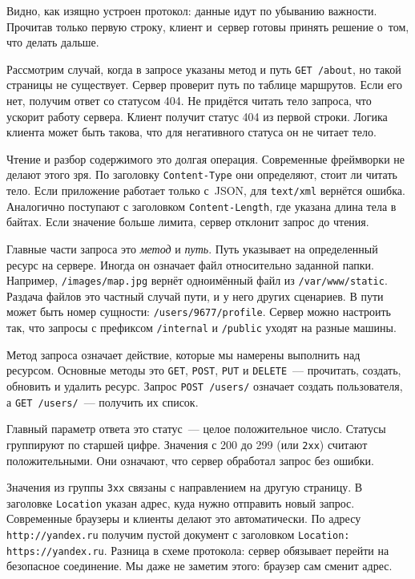 Видно, как изящно устроен протокол: данные идут по убыванию важности. Прочитав
только первую строку, клиент и~сервер готовы принять решение о~том, что делать
дальше.


Рассмотрим случай, когда в запросе указаны метод и путь \verb|GET /about|, но
такой страницы не существует. Сервер проверит путь по таблице маршрутов. Если
его нет, получим ответ со статусом 404. Не придётся читать тело запроса, что
ускорит работу сервера. Клиент получит статус 404 из первой строки. Логика
клиента может быть такова, что для негативного статуса он не читает тело.

Чтение и разбор содержимого это долгая операция. Современные фреймворки не
делают этого зря. По заголовку \verb|Content-Type| они определяют, стоит ли
читать тело. Если приложение работает только с~JSON, для \verb|text/xml|
вернётся ошибка. Аналогично поступают с заголовком \verb|Content-Length|, где
указана длина тела в байтах. Если значение больше лимита, сервер отклонит запрос
до чтения.


Главные части запроса это \emph{метод} и \emph{путь}. Путь указывает на
определенный ресурс на сервере. Иногда он означает файл относительно заданной
папки. Например, \verb|/images/map.jpg| вернёт одноимённый файл из
\verb|/var/www/static|. Раздача файлов это частный случай пути, и у него других
сценариев. В пути может быть номер сущности: \verb|/users/9677/profile|. Сервер
можно настроить так, что запросы с префиксом \verb|/internal| и \verb|/public|
уходят на разные машины.

Метод запроса означает действие, которые мы намерены выполнить над
ресурсом. Основные методы это \verb|GET|, \verb|POST|, \verb|PUT| и
\verb|DELETE|~--- прочитать, создать, обновить и удалить ресурс. Запрос
\verb|POST /users/| означает создать пользователя, а \verb|GET /users/|~---
получить их список.

Главный параметр ответа это статус~--- целое положительное число. Статусы
группируют по старшей цифре. Значения с 200 до 299 (или \verb|2хх|) считают
положительными. Они означают, что сервер обработал запрос без ошибки.

Значения из группы \verb|3хх| связаны с направлением на другую страницу. В
заголовке \verb|Location| указан адрес, куда нужно отправить новый
запрос. Современные браузеры и клиенты делают это автоматически. По адресу
\verb|http://yandex.ru| получим пустой документ с заголовком
\verb|Location: https://yandex.ru|. Разница в схеме протокола:
сервер обязывает перейти на безопасное соединение. Мы даже не заметим этого:
браузер сам сменит адрес.


